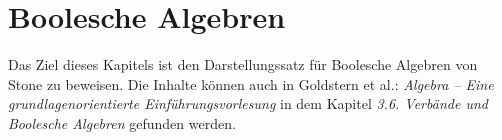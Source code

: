 \chapter{Boolesche Algebren}

Das Ziel dieses Kapitels ist den Darstellungssatz für Boolesche Algebren von Stone zu beweisen. Die Inhalte können auch in Goldstern et al.: \textit{Algebra -- Eine grundlagenorientierte Einführungsvorlesung} in dem Kapitel \textit{3.6. Verbände und Boolesche Algebren} gefunden werden.



